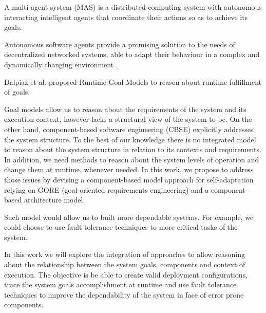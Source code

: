 A multi-agent system (MAS) is a distributed computing system with autonomous interacting intelligent agents that coordinate their actions so as to achieve its goals\cite{woolridge_introduction_2001}.

Autonomous software agents provide a promising solution to the needs of decentralized networked systems, able to adapt their behaviour in a complex and dynamically changing environment \cite{morandini_goal-oriented_2009}.

Dalpiaz et al.\cite{dalpiaz_runtime_2013} proposed Runtime Goal Models to reason about runtime fulfillment of goals.


Goal models allow us to reason about the requirements of the system and its execution context, however lacks a structural view of the system to be. On the other hand, component-based software engineering (CBSE) explicitly addresses the system structure. To the best of our knowledge there is no integrated model to reason about the system structure in relation to its contexts and requirements.
In addition, we need methods to reason about the system levels of operation and change them at runtime, whenever needed. In this work, we propose to address those issues by devising a component-based model approach for self-adaptation relying on GORE (goal-oriented requirements engineering) and a component-based architecture model.

Such model would allow us to built more dependable systems. For example, we could choose to use fault tolerance techniques to more critical tasks of the system.

 In this work we will explore the integration of approaches to allow reasoning about the relationship between the system goals, components and context of execution.
 The objective is be able to create valid deployment configurations, trace the system goals accomplishment at runtime and use fault tolerance techniques to improve the dependability of the system in face of error prone components.
